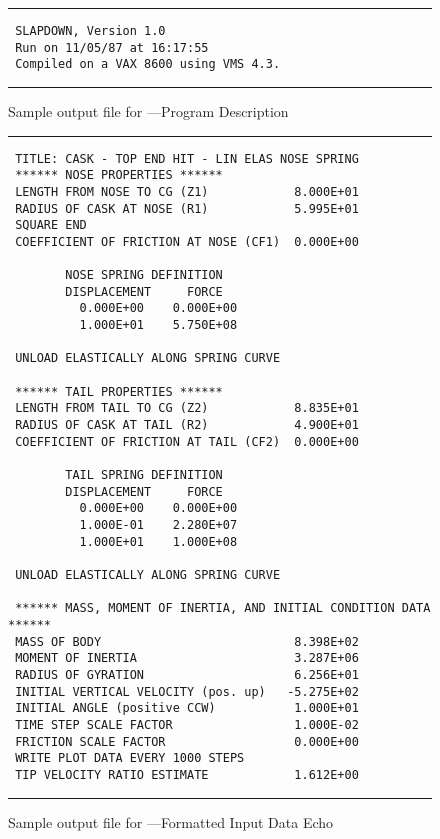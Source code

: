 \begin{figure}
\parskip0pt
\hrule
\small
\begin{verbatim}
 SLAPDOWN, Version 1.0
 Run on 11/05/87 at 16:17:55
 Compiled on a VAX 8600 using VMS 4.3.
\end{verbatim}
\hrule
\caption{Sample output file for \SLAP---Program Description}\label{sampout1}
\end{figure}
\begin{figure}
\parskip0pt
\hrule\small
\begin{verbatim}
 TITLE: CASK - TOP END HIT - LIN ELAS NOSE SPRING
 ****** NOSE PROPERTIES ******
 LENGTH FROM NOSE TO CG (Z1)            8.000E+01
 RADIUS OF CASK AT NOSE (R1)            5.995E+01
 SQUARE END
 COEFFICIENT OF FRICTION AT NOSE (CF1)  0.000E+00

        NOSE SPRING DEFINITION
        DISPLACEMENT     FORCE
          0.000E+00    0.000E+00
          1.000E+01    5.750E+08

 UNLOAD ELASTICALLY ALONG SPRING CURVE

 ****** TAIL PROPERTIES ******
 LENGTH FROM TAIL TO CG (Z2)            8.835E+01
 RADIUS OF CASK AT TAIL (R2)            4.900E+01
 COEFFICIENT OF FRICTION AT TAIL (CF2)  0.000E+00

        TAIL SPRING DEFINITION
        DISPLACEMENT     FORCE
          0.000E+00    0.000E+00
          1.000E-01    2.280E+07
          1.000E+01    1.000E+08

 UNLOAD ELASTICALLY ALONG SPRING CURVE

 ****** MASS, MOMENT OF INERTIA, AND INITIAL CONDITION DATA ******
 MASS OF BODY                           8.398E+02
 MOMENT OF INERTIA                      3.287E+06
 RADIUS OF GYRATION                     6.256E+01
 INITIAL VERTICAL VELOCITY (pos. up)   -5.275E+02
 INITIAL ANGLE (positive CCW)           1.000E+01
 TIME STEP SCALE FACTOR                 1.000E-02
 FRICTION SCALE FACTOR                  0.000E+00
 WRITE PLOT DATA EVERY 1000 STEPS
 TIP VELOCITY RATIO ESTIMATE            1.612E+00
\end{verbatim}
\hrule
\caption{Sample output file for \SLAP---Formatted Input
Data Echo}\label{sampout2} 
\end{figure}


